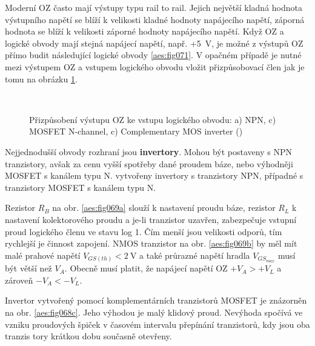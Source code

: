 
    Moderní OZ často mají výstupy typu rail to rail. Jejich největší kladná hodnota výstupního
    napětí se blíží k velikosti kladné hodnoty napájecího napětí, záporná hodnota se blíží k
    velikosti záporné hodnoty napájecího napětí. Když OZ a logické obvody mají stejná napájecí
    napětí, např. +\SI{5}{\volt}, je možné z výstupů OZ přímo budit následující logické obvody
    \ref{aes:fig071}. V opačném případě je nutné mezi výstupem OZ a vstupem logického obvodu vložit
    přizpůsobovací člen \cite[s.~2]{AN849} jak je tomu na obrázku \ref{aes:fig069}.
    

    \begin{figure}[ht!]  %
      \centering
         \\
      \caption{Přizpůsobení výstupu OZ ke vstupu logického obvodu: a) NPN, c) MOSFET N-channel, c)
                Complementary MOS inverter (\cite[s.~2]{AN849})}
      \label{aes:fig069}
    \end{figure}

    Nejjednodušší obvody rozhraní jsou \textbf{invertory}. Mohou být postaveny s NPN tranzistory,
    avšak za cenu vyšší spotřeby dané proudem báze, nebo výhodněji MOSFET s kanálem typu N.
    vytvořeny invertory s tranzistory NPN, případné s tranzistory MOSFET s kanálem typu N. 
    
    Rezistor \(R_B\) na obr. \ref{aes:fig069a} slouží k nastavení proudu báze, rezistor \(R_L\) k
    nastavení kolektorového proudu a je-li tranzistor uzavřen, zabezpečuje vstupní proud logického
    členu ve stavu log 1. Čím menší jsou velikosti odporů, tím rychlejší je činnost zapojení. NMOS
    tranzistor na obr. \ref{aes:fig069b} by měl mít malé prahové napětí \(V_{GS(th)}
    <\SI{2}{\volt}\) a také průrazné napětí hradla \(V_{GS_{max}}\) musí být větší než \(V_A\).
    Obecně musí platit, že napájecí napětí OZ \(+V_A > +V_L\) a zároveň \(-V_A < -V_L\).

    Invertor vytvořený pomocí komplementárních tranzistorů MOSFET je znázorněn na obr.
    \ref{aes:fig068c}. Jeho výhodou je malý klidový proud. Nevýhoda spočívá ve vzniku proudových
    špiček v časovém intervalu přepínání tranzistorů, kdy jsou oba tranzis tory krátkou dobu
    současně otevřeny.

